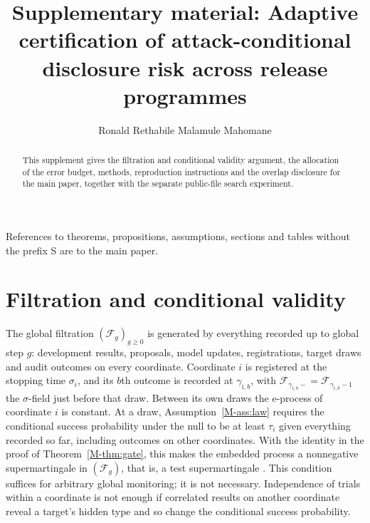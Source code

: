 \documentclass{jpc}
\newcommand{\F}{\mathcal F}
\begin{document}
\title[Supplement: adaptive certification of disclosure risk]{Supplementary material: Adaptive certification of attack-conditional disclosure risk across release programmes}
\author{Ronald Rethabile Malamule Mahomane}
\address{Department of Computing, Mathematical and Statistical Sciences, University of Namibia, Windhoek; School of Pathology, Faculty of Health Sciences, University of the Witwatersrand, Johannesburg; Basis Energy, Victoria, Australia}
\begin{abstract}
This supplement gives the filtration and conditional validity argument, the allocation of the error budget, methods, reproduction instructions and the overlap disclosure for the main paper, together with the separate public-file search experiment.
\end{abstract}
\maketitle

\noindent References to theorems, propositions, assumptions, sections and tables without the prefix S are to the main paper.

\section{Filtration and conditional validity}\label{sec:s-filtration}
The global filtration $(\F_g)_{g\ge0}$ is generated by everything recorded up to global step $g$: development results, proposals, model updates, registrations, target draws and audit outcomes on every coordinate. Coordinate $i$ is registered at the stopping time $\sigma_i$, and its $b$th outcome is recorded at $\gamma_{i,b}$, with $\F_{\gamma_{i,b}-}=\F_{\gamma_{i,b}-1}$ the $\sigma$-field just before that draw. Between its own draws the e-process of coordinate $i$ is constant. At a draw, Assumption~\ref{M-ass:law} requires the conditional success probability under the null to be at least $\tau_i$ given everything recorded so far, including outcomes on other coordinates. With the identity in the proof of Theorem~\ref{M-thm:gate}, this makes the embedded process a nonnegative supermartingale in $(\F_g)$, that is, a test supermartingale \cite{shafer2011,ramdas2023}. This condition suffices for arbitrary global monitoring; it is not necessary. Independence of trials within a coordinate is not enough if correlated results on another coordinate reveal a target's hidden type and so change the conditional success probability.
\end{document}
